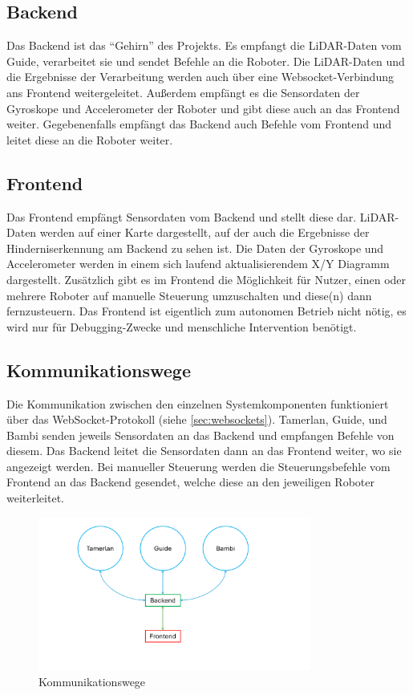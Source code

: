 \subsection{Backend}
Das Backend ist das ``Gehirn'' des Projekts.
%
Es empfangt die LiDAR-Daten vom Guide,
verarbeitet sie
und sendet Befehle an die Roboter.
%
Die LiDAR-Daten und die Ergebnisse der Verarbeitung werden auch
über eine Websocket-Verbindung ans Frontend weitergeleitet.
%
Außerdem empfängt es die Sensordaten der Gyroskope und Accelerometer der Roboter
und gibt diese auch an das Frontend weiter. 
%
Gegebenenfalls empfängt das Backend auch Befehle vom Frontend und leitet diese an die Roboter weiter.

\subsection{Frontend}
Das Frontend empfängt Sensordaten vom Backend und stellt diese dar.
%
LiDAR-Daten werden auf einer Karte dargestellt,
auf der auch die Ergebnisse der Hinderniserkennung am Backend zu sehen ist.
%
Die Daten der Gyroskope und Accelerometer werden in einem sich laufend aktualisierendem X/Y Diagramm dargestellt.
%
Zusätzlich gibt es im Frontend die Möglichkeit für Nutzer,
einen oder mehrere Roboter auf manuelle Steuerung umzuschalten
und diese(n) dann fernzusteuern.
%
Das Frontend ist eigentlich zum autonomen Betrieb nicht nötig,
es wird nur für Debugging-Zwecke und menschliche Intervention benötigt.

\subsection{Kommunikationswege}
\label{subsec:ueberblick_comms}
Die Kommunikation zwischen den einzelnen Systemkomponenten
funktioniert über das WebSocket-Protokoll (siehe \ref{sec:websockets}).
%
Tamerlan, Guide, und Bambi senden jeweils
Sensordaten an das Backend und empfangen Befehle von diesem.
%
Das Backend leitet die Sensordaten dann an das Frontend weiter,
wo sie angezeigt werden.
%
Bei manueller Steuerung werden die Steuerungsbefehle vom Frontend an das Backend gesendet,
welche diese an den jeweiligen Roboter weiterleitet. 
\begin{figure}[H]
    \centering
        \includegraphics[width=0.8\textwidth, center, trim={135 90 215 20}, clip]{img/Kommunikationswege.png}  
    \caption{Kommunikationswege}
    \label{fig:kommunikationswege}
\end{figure}

